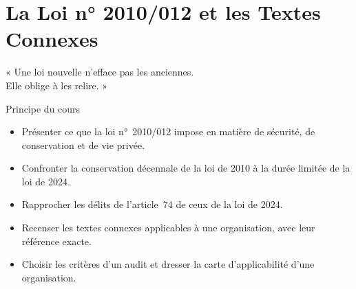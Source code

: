 
\chapter{La Loi n° 2010/012 et les Textes Connexes}
\label{chap:loi2010}

\epigraph{%
    « Une loi nouvelle n'efface pas les anciennes.\\
    Elle oblige à les relire. »%
}{Principe du cours}


\begin{boxobjectifs}
\begin{itemize}
    \item Présenter ce que la loi n°~2010/012 impose en matière de sécurité,
          de conservation et de vie privée.
    \item Confronter la conservation décennale de la loi de 2010 à la durée
          limitée de la loi de 2024.
    \item Rapprocher les délits de l'article~74 de ceux de la loi de 2024.
    \item Recenser les textes connexes applicables à une organisation, avec
          leur référence exacte.
    \item Choisir les critères d'un audit et dresser la carte
          d'applicabilité d'une organisation.
\end{itemize}
\end{boxobjectifs}

\bigskip

